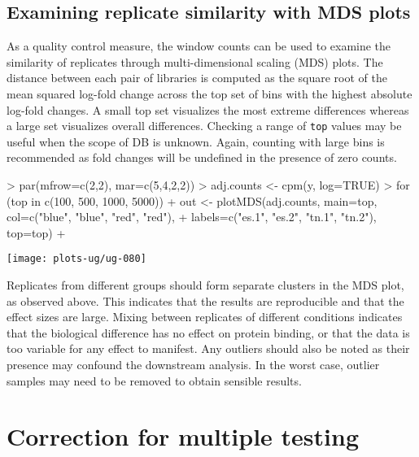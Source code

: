 \documentclass[12pt]{report}
\renewenvironment{Schunk}{\vspace{0pt}}{\vspace{0pt}}
\newcommand{\code}[1]{{\small\texttt{#1}}}
\begin{document}
\section{Examining replicate similarity with MDS plots}
As a quality control measure, the window counts can be used to examine the similarity of replicates through multi-dimensional scaling (MDS) plots. 
The distance between each pair of libraries is computed as the square root of the mean squared log-fold change across the top set of bins with the highest absolute log-fold changes.
A small top set visualizes the most extreme differences whereas a large set visualizes overall differences.
Checking a range of \code{top} values may be useful when the scope of DB is unknown.
Again, counting with large bins is recommended as fold changes will be undefined in the presence of zero counts.

\begin{Schunk}
\begin{Sinput}
> par(mfrow=c(2,2), mar=c(5,4,2,2))
> adj.counts <- cpm(y, log=TRUE)
> for (top in c(100, 500, 1000, 5000)) {
+     out <- plotMDS(adj.counts, main=top, col=c("blue", "blue", "red", "red"),
+         labels=c("es.1", "es.2", "tn.1", "tn.2"), top=top)
+ }
\end{Sinput}
\end{Schunk}

\begin{center}
\texttt{[image: plots-ug/ug-080]}
\end{center}

Replicates from different groups should form separate clusters in the MDS plot, as observed above.
This indicates that the results are reproducible and that the effect sizes are large.
Mixing between replicates of different conditions indicates that the biological difference has no effect on protein binding, or that the data is too variable for any effect to manifest.
Any outliers should also be noted as their presence may confound the downstream analysis.
In the worst case, outlier samples may need to be removed to obtain sensible results.



\chapter{Correction for multiple testing}
\end{document}
